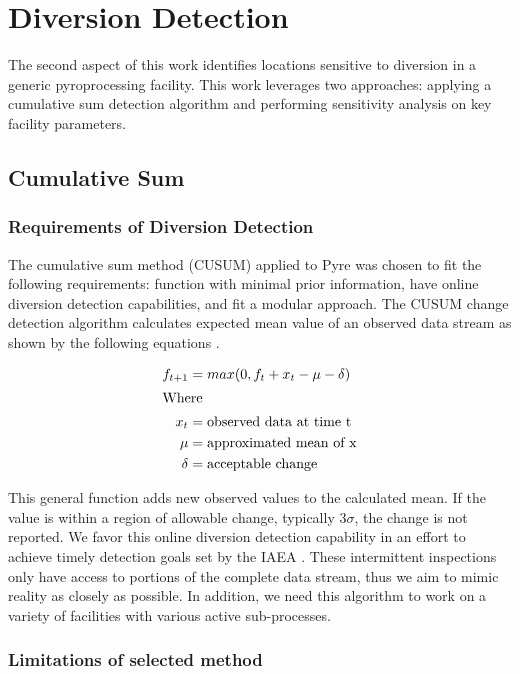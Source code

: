 \chapter[Diversion Detection]{Diversion Detection}

The second aspect of this work identifies locations sensitive to diversion in a generic pyroprocessing facility. This work leverages two approaches: applying
a cumulative sum detection algorithm and performing sensitivity analysis on key facility parameters. 
\section{Cumulative Sum}

\subsection{Requirements of Diversion Detection}


The cumulative sum method (CUSUM) applied to Pyre was chosen to fit the following requirements: function with minimal prior information, have online diversion detection
capabilities, and fit a modular approach. The CUSUM change detection algorithm calculates expected mean value of an observed data stream as shown by the following equations \cite{basseville_detection_1993}.

\begin{align}
	f_{t+1} &= max(0, f_t + x_t - \mu - \delta) \\
	\intertext{Where}
	x_t &= \mbox{observed data at time t} \nonumber \\
	\mu &= \mbox{approximated mean of x} \nonumber \\
	\delta &= \mbox{acceptable change} \nonumber
\end{align}

This general function adds new observed values to the calculated mean. If the value is within a region of allowable change, typically 3$\sigma$, the change is not reported. 
We favor this online diversion detection capability in an effort to achieve timely detection goals set by the IAEA \cite{international_atomic_energy_agency_implications_2004}.
These intermittent inspections only have access to portions of the complete data stream, thus we aim to mimic reality as closely as possible. In addition, we need this
algorithm to work on a variety of facilities with various active sub-processes.

\subsection{Limitations of selected method}


